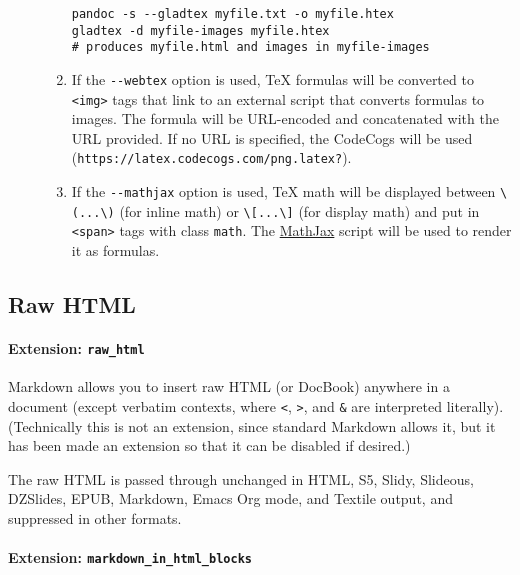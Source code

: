 \documentclass[]{article}
\let\oldparagraph\paragraph
\renewcommand{\paragraph}[1]{\oldparagraph{#1}\mbox{}}
\begin{document}
\begin{description}
\begin{enumerate}
\begin{verbatim}
pandoc -s --gladtex myfile.txt -o myfile.htex
gladtex -d myfile-images myfile.htex
# produces myfile.html and images in myfile-images
\end{verbatim}
\item
  If the \texttt{-\/-webtex} option is used, TeX formulas will be
  converted to \texttt{\textless{}img\textgreater{}} tags that link to
  an external script that converts formulas to images. The formula will
  be URL-encoded and concatenated with the URL provided. If no URL is
  specified, the CodeCogs will be used
  (\texttt{https://latex.codecogs.com/png.latex?}).
\item
  If the \texttt{-\/-mathjax} option is used, TeX math will be displayed
  between \texttt{\textbackslash{}(...\textbackslash{})} (for inline
  math) or \texttt{\textbackslash{}{[}...\textbackslash{}{]}} (for
  display math) and put in \texttt{\textless{}span\textgreater{}} tags
  with class \texttt{math}. The \href{https://www.mathjax.org}{MathJax}
  script will be used to render it as formulas.
\end{enumerate}
\end{description}

\subsection{Raw HTML}\label{raw-html}

\paragraph{\texorpdfstring{Extension:
\texttt{raw\_html}}{Extension: raw\_html}}\label{extension-raw_html}

Markdown allows you to insert raw HTML (or DocBook) anywhere in a
document (except verbatim contexts, where \texttt{\textless{}},
\texttt{\textgreater{}}, and \texttt{\&} are interpreted literally).
(Technically this is not an extension, since standard Markdown allows
it, but it has been made an extension so that it can be disabled if
desired.)

The raw HTML is passed through unchanged in HTML, S5, Slidy, Slideous,
DZSlides, EPUB, Markdown, Emacs Org mode, and Textile output, and
suppressed in other formats.

\hypertarget{extension-markdown_in_html_blocks}{\paragraph{\texorpdfstring{Extension:
\texttt{markdown\_in\_html\_blocks}}{Extension: markdown\_in\_html\_blocks}}\label{extension-markdown_in_html_blocks}}
\end{document}
